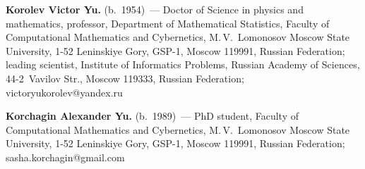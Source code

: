 \noindent
\textbf{Korolev Victor Yu.} (b.\ 1954)~---
Doctor of Science in physics and mathematics, professor,
Department of Mathematical Statistics, Faculty of Computational Mathematics
and Cybernetics, M.\,V.~Lomonosov Moscow State University,
1-52 Leninskiye Gory, GSP-1, Moscow 119991, Russian Federation;
leading scientist, Institute of Informatics Problems,
Russian Academy of Sciences, 44-2~Vavilov Str., Moscow 119333, Russian
Federation; victoryukorolev@yandex.ru

\vspace*{3pt}

\noindent
\textbf{Korchagin Alexander Yu.} (b.\ 1989)~---
PhD student, Faculty of Computational Mathematics and Cybernetics,
M.\,V.~Lomonosov Moscow State University,
1-52 Leninskiye Gory, GSP-1, Moscow 119991, Russian Federation;
sasha.korchagin@gmail.com


\label{end\stat}

\renewcommand{\bibname}{\protect\rm Литература}